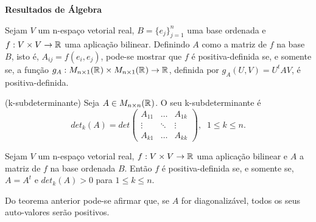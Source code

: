 \documentclass{beamer}
\newcommand{\titulo}[1]{\centering \textbf{#1}}
\begin{document}
\begin{frame}
	\titulo{Resultados de Álgebra}
		
	Sejam $V$ um n-espaço vetorial real, $B= \{e_{j}\}_{j=1}^{n}$ uma base ordenada e $f:V\times V\to \mathbb{R}^{}$ uma aplicação bilinear. Definindo $A$ como a matriz de $f$ na base $B$, isto é, $A_{ij} = f(e_{i}, e_{j})$, pode-se mostrar que $f$ é positiva-definida se, e somente se, a função $g_{A}: M_{n\times 1}(\mathbb{R}^{})\times M_{n\times 1}(\mathbb{R}^{}) \to \mathbb{R}^{}$, definida por $
		g_{A}(U,V) = U^{t}AV$, é positiva-definida.
	
	\begin{definicao}
		(k-subdeterminante) Seja $A \in M_{n \times n}(\mathbb{R}^{})$. O seu k-subdeterminante é
		$$
		det_{k}(A) =
		det \left(
		\begin{array}{ccc}
		A_{11} & \dots & A_{1k}
		\\
		\vdots & \ddots & \vdots
		\\
		A_{k1} & \dots & A_{kk}
		\end{array}
		\right),\;\; 1\leq k \leq n.
		$$
	\end{definicao}	
\end{frame}

\begin{frame}
	\begin{teorema}
		Sejam $V$ um n-espaço vetorial real, $f: V\times V\to \mathbb{R}^{}$ uma aplicação bilinear e $A$ a matriz de $f$ na base ordenada $B$. Então $f$ é positiva-definida se, e somente se, $A=A^{t}$ e $det_{k}(A)>0$ para $1\leq k\leq n$.
	\end{teorema}
	
	\begin{observacao}
		Do teorema anterior pode-se afirmar que, se $A$ for diagonalizável, todos os seus auto-valores serão positivos.
	\end{observacao}
\end{frame}
\end{document}
